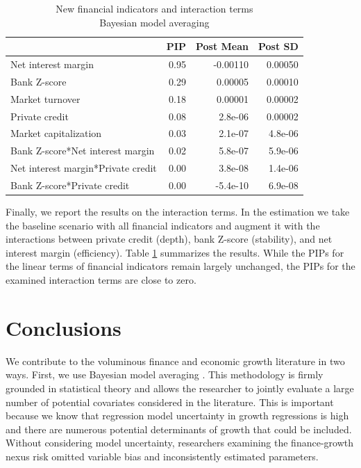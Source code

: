 \begin{table}[!htbp]
	\centering
	\caption{New financial indicators and interaction terms\\
		Bayesian model averaging}
		\label{ch2fig:BMAint}
	\small
	\begin{tabular}{lrrr}
		\toprule
		& PIP & Post Mean & Post SD \\ 
		\midrule
		  Net interest margin & 0.95 & -0.00110 & 0.00050 \\
		  Bank Z-score & 0.29 & 0.00005 & 0.00010 \\
		  Market turnover & 0.18 & 0.00001 & 0.00002 \\
		  Private credit & 0.08 & 2.8e-06 & 0.00002 \\
		  Market capitalization & 0.03 & 2.1e-07 & 4.8e-06\\
		  Bank Z-score*Net interest margin & 0.02 & 5.8e-07 & 5.9e-06 \\
		  Net interest margin*Private credit & 0.00 & 3.8e-08 & 1.4e-06\\
		  Bank Z-score*Private credit & 0.00 &-5.4e-10 & 6.9e-08 \\
		\bottomrule
	\end{tabular}
\end{table}

Finally, we report the results on the interaction terms. In the estimation we take the baseline scenario with all financial indicators and augment it with the interactions between private credit (depth), bank Z-score (stability), and net interest margin (efficiency). Table \ref{ch2fig:BMAint} summarizes the results. While the \acp{PIP} for the linear terms of financial indicators remain largely unchanged, the \acp{PIP} for the examined interaction terms are close to zero.

\section{Conclusions}
\label{ch2sec:conclusions}
We contribute to the voluminous finance and economic growth literature in two ways. First, we use Bayesian model averaging \citep{Rafteryetal1997}. This methodology is firmly grounded in statistical theory and allows the researcher to jointly evaluate a large number of potential covariates considered in the literature. This is important because we know that regression model uncertainty in growth regressions is high \citep{SalaiMartinetal2004,Durlaufetal2008} and there are numerous potential determinants of growth that could be included. Without considering model uncertainty, researchers examining the finance-growth nexus risk omitted variable bias and inconsistently estimated parameters. 

